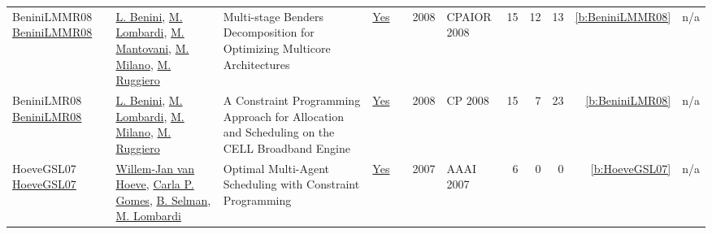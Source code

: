 {\begin{longtable}{>{\raggedright\arraybackslash}p{3cm}>{\raggedright\arraybackslash}p{6cm}>{\raggedright\arraybackslash}p{6.5cm}rrrp{2.5cm}rrrrr}
BeniniLMMR08 \href{https://doi.org/10.1007/978-3-540-68155-7_6}{BeniniLMMR08} & \hyperref[auth:a247]{L. Benini}, \hyperref[auth:a143]{M. Lombardi}, \hyperref[auth:a1168]{M. Mantovani}, \hyperref[auth:a144]{M. Milano}, \hyperref[auth:a724]{M. Ruggiero} & Multi-stage Benders Decomposition for Optimizing Multicore Architectures & \href{../works/BeniniLMMR08.pdf}{Yes} & \cite{BeniniLMMR08} & 2008 & CPAIOR 2008 & 15 & 12 & 13 & \ref{b:BeniniLMMR08} & n/a\\
BeniniLMR08 \href{http://dx.doi.org/10.1007/978-3-540-85958-1_2}{BeniniLMR08} & \hyperref[auth:a247]{L. Benini}, \hyperref[auth:a143]{M. Lombardi}, \hyperref[auth:a144]{M. Milano}, \hyperref[auth:a724]{M. Ruggiero} & A Constraint Programming Approach for Allocation and Scheduling on the CELL Broadband Engine & \href{../works/BeniniLMR08.pdf}{Yes} & \cite{BeniniLMR08} & 2008 & CP 2008 & 15 & 7 & 23 & \ref{b:BeniniLMR08} & n/a\\
HoeveGSL07 \href{http://www.aaai.org/Library/AAAI/2007/aaai07-291.php}{HoeveGSL07} & \hyperref[auth:a211]{Willem{-}Jan van Hoeve}, \hyperref[auth:a648]{Carla P. Gomes}, \hyperref[auth:a649]{B. Selman}, \hyperref[auth:a143]{M. Lombardi} & Optimal Multi-Agent Scheduling with Constraint Programming & \href{../works/HoeveGSL07.pdf}{Yes} & \cite{HoeveGSL07} & 2007 & AAAI 2007 & 6 & 0 & 0 & \ref{b:HoeveGSL07} & n/a\\
\end{longtable}
}

\clearpage

